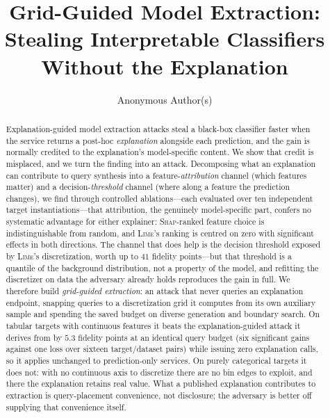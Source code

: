 \documentclass[sigconf,anonymous,review]{acmart}
\begin{document}
\title[Grid-Guided Model Extraction]{Grid-Guided Model Extraction:
Stealing Interpretable Classifiers Without the Explanation}

\author{Anonymous Author(s)}
\email{}
\renewcommand{\shortauthors}{Anonymous}

\begin{abstract}
Explanation-guided model extraction attacks steal a black-box classifier faster when the service
returns a post-hoc \emph{explanation} alongside each prediction, and the gain is normally credited to
the explanation's model-specific content. We show that credit is misplaced, and we turn the finding
into an attack. Decomposing what an explanation can contribute to query synthesis into a
feature-\emph{attribution} channel (which features matter) and a decision-\emph{threshold} channel
(where along a feature the prediction changes), we find through controlled ablations---each evaluated
over ten independent target instantiations---that attribution, the genuinely model-specific part,
confers no systematic advantage for either explainer: \textsc{Shap}-ranked feature choice is
indistinguishable from random, and \textsc{Lime}'s ranking is centred on zero with significant effects
in both directions. The channel that does help is the decision threshold exposed by \textsc{Lime}'s
discretization, worth up to $41$ fidelity points---but that threshold is a quantile of the background
distribution, not a property of the model, and refitting the discretizer on data the adversary already
holds reproduces the gain in full. We therefore build \emph{grid-guided extraction}: an attack that
never queries an explanation endpoint, snapping queries to a discretization grid it computes from its
own auxiliary sample and spending the saved budget on diverse generation and boundary search. On
tabular targets with continuous features it beats the explanation-guided attack it derives from by
$5.3$ fidelity points at an identical query budget (six significant gains against one loss over
sixteen target/dataset pairs) while issuing zero explanation calls, so it applies unchanged to
prediction-only services. On purely categorical targets it does not: with no continuous axis to
discretize there are no bin edges to exploit, and there the explanation retains real value. What a published explanation contributes to extraction is query-placement
convenience, not disclosure; the adversary is better off supplying that convenience itself.
\end{abstract}
\end{document}
